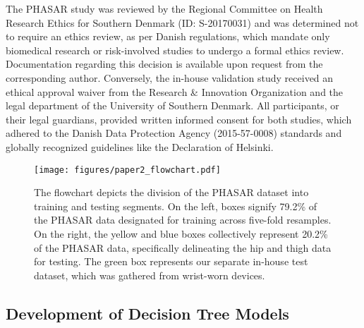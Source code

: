\documentclass[
  10pt,
]{scrbook}
\begin{document}
The PHASAR study was reviewed by the Regional Committee on Health
Research Ethics for Southern Denmark (ID: S-20170031) and was determined
not to require an ethics review, as per Danish regulations, which
mandate only biomedical research or risk-involved studies to undergo a
formal ethics review. Documentation regarding this decision is available
upon request from the corresponding author. Conversely, the in-house
validation study received an ethical approval waiver from the Research
\& Innovation Organization and the legal department of the University of
Southern Denmark. All participants, or their legal guardians, provided
written informed consent for both studies, which adhered to the Danish
Data Protection Agency (2015-57-0008) standards and globally recognized
guidelines like the Declaration of Helsinki.

\begin{figure}

{\centering \texttt{[image: figures/paper2\_flowchart.pdf]}

}

\caption{\label{fig-paper2_flowchart}The flowchart depicts the division
of the PHASAR dataset into training and testing segments. On the left,
boxes signify 79.2\% of the PHASAR data designated for training across
five-fold resamples. On the right, the yellow and blue boxes
collectively represent 20.2\% of the PHASAR data, specifically
delineating the hip and thigh data for testing. The green box represents
our separate in-house test dataset, which was gathered from wrist-worn
devices.}

\end{figure}

\hypertarget{development-of-decision-tree-models}{%
\subsection{Development of Decision Tree
Models}\label{development-of-decision-tree-models}}
\end{document}
